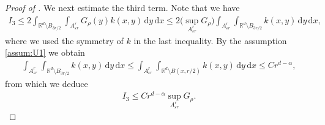 \documentclass[reqno]{amsart}
\theoremstyle{plain}
\theoremstyle{definition}
\numberwithin{equation}{section}
\newcommand{\Rd}{\mathbb{R}^d}
\newcommand{\dx} {\, \mathrm{d}x}
\newcommand{\dy} {\, \mathrm{d}y}
\begin{document}
\begin{proof} [Proof of ]
We next estimate the third term. Note that we have
\begin{align*}
I_3 
\leq 2 \int_{\Rd \setminus B_{3r/2}} \int_{A^r_{\varepsilon r}} G_{\rho}(y) k(x,y) \dy \dx
\leq 2\bigg( \sup_{A^r_{\varepsilon r}} G_{\rho} \bigg)
\int_{A^r_{\varepsilon r}} \int_{\Rd \setminus B_{3r/2}} k(x,y) \dy \dx,
\end{align*}
where we used the symmetry of $k$ in the last inequality. 
By the assumption \eqref{assum:U1} we obtain
\begin{align*}
\int_{A^r_{\varepsilon r}} \int_{\Rd \setminus B_{3r/2}} k(x,y) \dy \dx
\leq \int_{A^r_{\varepsilon r}} \int_{\Rd \setminus B(x, r/2)} k(x,y) \dy \dx
\leq Cr^{d-\alpha},
\end{align*}
from which we deduce
\begin{align} \label{eq:I_3_lower}
I_3 \leq C r^{d-\alpha} \sup_{A^r_{\varepsilon r}} G_{\rho}.
\end{align}



\end{proof}
\end{document}
